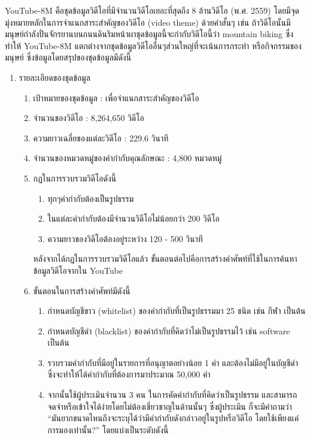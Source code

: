 YouTube-8M คือชุดข้อมูลวิดีโอที่มีจำนวนวิดีโอเยอะที่สุดถึง 8 ล้านวิดีโอ (พ.ศ. 2559) โดยมีจุดมุ่งหมายหลักในการจำแนกสาระสำคัญของวิดีโอ (video theme) 
ด้วยคำสั้นๆ เช่น ถ้าวิดีโอนั้นมีมนุษย์กำลังปั่นจักรยานบนถนนดินริมหน้าผาชุดข้อมูลนี้จะกำกับวิดีโอนี้ว่า mountain biking ซึ่งทำให้ YouTube-8M 
แตกต่างจากชุดข้อมูลวิดีโออื่นๆส่วนใหญ่ที่จะเน้นการกระทำ หรือกิจกรรมของมนุษย์ ซึ่งข้อมูลโดยสรุปของชุดข้อมูลมีดังนี้
\begin{enumerate}
	\item {รายละเอียดของชุดข้อมูล}
	\begin{enumerate}
		\setlength\itemsep{-0.25em}
		\item เป้าหมายของชุดข้อมูล : เพื่อจำแนกสาระสำคัญของวิดีโอ
		\item จำนวนของวิดีโอ : 8,264,650 วิดีโอ
		\item ความยาวเฉลี่ยของแต่ละวิดีโอ : 229.6 วินาที
		\item จำนวนของหมวดหมู่ของคำกำกับคุณลักษณะ : 4,800 หมวดหมู่
		\item กฏในการรวบรวมวิดีโอดังนี้
		\begin{enumerate}
			\setlength\itemsep{-0.25em}
			\item ทุกๆคำกำกับต้องเป็นรูปธรรม
			\item ในแต่ละคำกำกับต้องมีจำนวนวิดีโอไม่น้อยกว่า 200 วิดีโอ
			\item ความยาวของวิดีโอต้องอยู่ระหว่าง 120 - 500 วินาที
		\end{enumerate}
		หลังจากได้กฏในการรวบรวมวิดีโอแล้ว ขั้นตอนต่อไปคือการสร้างคำศัพท์ที่ใช้ในการค้นหาข้อมูลวิดีโอจากใน YouTube 
		\item ขั้นตอนในการสร้างคำศัพท์มีดังนี้
		\begin{enumerate}
			\setlength\itemsep{-0.25em}
			\item กำหนดบัญชีขาว (whitelist) ของคำกำกับที่เป็นรูปธรรมมา 25 ชนิด เช่น กีฬา เป็นต้น
			\item กำหนดบัญชีดำ (blacklist) ของคำกำกับที่คิดว่าไม่เป็นรูปธรรมไว้ เช่น software เป็นต้น
			\item รวบรวมคำกำกับที่มีอยู่ในรายการที่อนุญาตอย่างน้อย 1 คำ และต้องไม่มีอยู่ในบัญชีดำ ซึ่งจะทำให้ได้คำกำกับที่ต้องการมาประมาณ 50,000 คำ
			\item จากนั้นใช้ผู้ประเมินจำนวน 3 คน ในการคัดคำกำกับที่คิดว่าเป็นรูปธรรม และสามารถจดจำหรือเข้าใจได้ง่ายโดยไม่ต้องเชี่ยวชาญในด้านนั้นๆ 
			ซึ่งผู้ประเมิน ก็จะมีคำถามว่า “มันยากขนาดไหนถึงจะระบุได้ว่ามีคำกำกับดังกล่าวอยู่ในรูปหรือวิดีโอ โดยใช้เพียงแค่การมองเท่านั้น?” โดยแบ่งเป็นระดับดังนี้
			\begin{enumerate}

\end{enumerate}
\end{enumerate}
\end{enumerate}
\end{enumerate}
